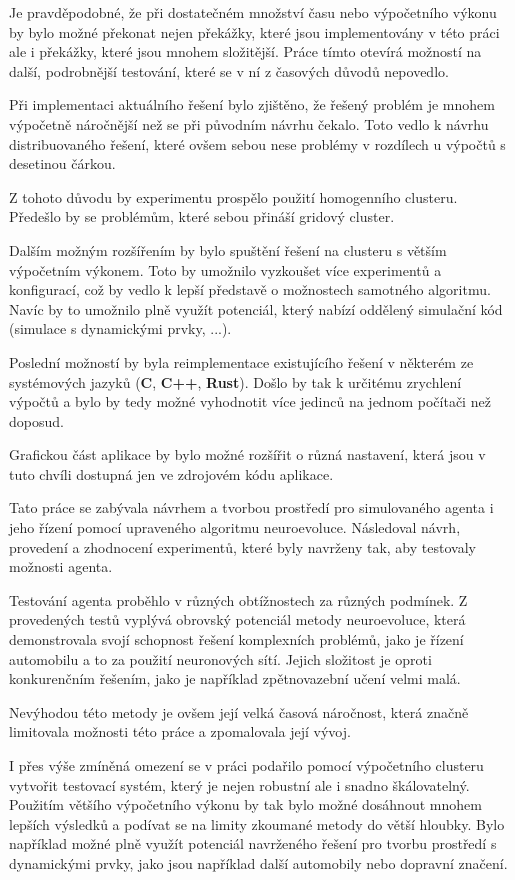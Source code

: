 Je pravděpodobné, že při dostatečném množství času nebo výpočetního výkonu by bylo možné překonat nejen překážky, které jsou implementovány v této práci ale i překážky, které jsou mnohem složitější. Práce tímto otevírá možností na další, podrobnější testování, které se v ní z časových důvodů nepovedlo.

Při implementaci aktuálního řešení bylo zjištěno, že řešený problém je mnohem výpočetně náročnější než se při původním návrhu čekalo. Toto vedlo k návrhu distribuovaného řešení, které ovšem sebou nese problémy v rozdílech u výpočtů s desetinou čárkou.

Z tohoto důvodu by experimentu prospělo použití homogenního clusteru. Předešlo by se problémům, které sebou přináší gridový cluster.

Dalším možným rozšířením by bylo spuštění řešení na clusteru s větším výpočetním výkonem. Toto by umožnilo vyzkoušet více experimentů a konfigurací, což by vedlo k lepší představě o  možnostech samotného algoritmu. Navíc by to umožnilo plně využít potenciál, který nabízí oddělený simulační kód (simulace s dynamickými prvky, ...). 

Poslední možností by byla reimplementace existujícího řešení v některém ze systémových jazyků (\textbf{C}, \textbf{C++}, \textbf{Rust}). Došlo by tak k určitému zrychlení výpočtů a bylo by tedy možné vyhodnotit více jedinců na jednom počítači než doposud. 

Grafickou část aplikace by bylo možné rozšířit o různá nastavení, která jsou v tuto chvíli dostupná jen ve zdrojovém kódu aplikace.

Tato práce se zabývala návrhem a  tvorbou prostředí pro simulovaného agenta i jeho řízení pomocí upraveného algoritmu neuroevoluce. Následoval návrh, provedení a zhodnocení experimentů, které byly navrženy tak, aby testovaly možnosti agenta.

Testování agenta proběhlo v různých obtížnostech za různých podmínek. Z provedených testů vyplývá obrovský potenciál metody neuroevoluce, která demonstrovala svojí schopnost řešení komplexních problémů, jako je řízení automobilu a to za použití neuronových sítí. Jejich složitost je oproti konkurenčním řešením, jako je například zpětnovazební učení velmi malá.

Nevýhodou této metody je ovšem její velká časová náročnost, která značně limitovala možnosti této práce a zpomalovala její vývoj.

I přes výše zmíněná omezení se v práci podařilo pomocí výpočetního clusteru vytvořit testovací systém, který je nejen robustní ale i snadno škálovatelný. Použitím většího výpočetního výkonu by tak bylo možné dosáhnout mnohem lepších výsledků a podívat se na limity zkoumané metody do větší hloubky. Bylo například možné plně využít potenciál navrženého řešení pro tvorbu prostředí s dynamickými prvky, jako jsou například další automobily nebo dopravní značení.
